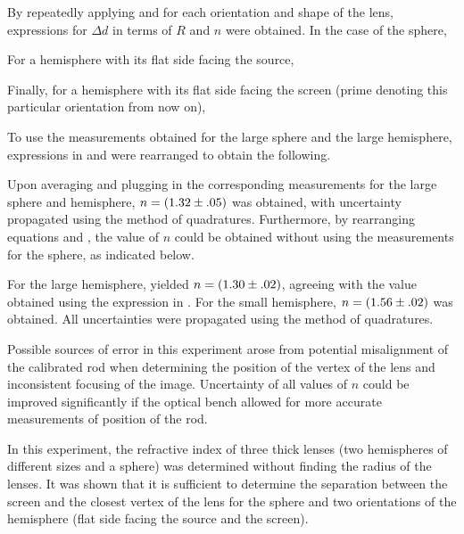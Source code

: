 \begin{paper}
	By repeatedly applying \eqVertexToSecondaryPrincipalPlane and \eqLensMakersFormula for each orientation and shape of the lens, expressions for \( \Delta d \) in terms of \( R \) and \( n \) were obtained. In the case of the sphere,
	
	For a hemisphere with its flat side facing the source, 
	
	Finally, for a hemisphere with its flat side facing the screen (prime denoting this particular orientation from now on),
	
	To use the measurements obtained for the large sphere and the large hemisphere, expressions in \eqSphereData and \eqHemisphereFlatScreen were rearranged to obtain the following.
	
	Upon averaging and plugging in the corresponding measurements for the large sphere and hemisphere, \( n = \left(1.32 \pm .05\right) \) was obtained, with uncertainty propagated using the method of quadratures. Furthermore, by rearranging equations \eqHemisphereFlatSource and \eqHemisphereFlatScreen, the value of \( n \) could be obtained without using the measurements for the sphere, as indicated below.
	
	For the large hemisphere, \eqnHemisphereOnly yielded \( n = \left(1.30 \pm .02\right) \), agreeing with the value obtained using the expression in \eqnValueWithSphere. For the small hemisphere, \( n = \left(1.56 \pm .02\right) \) was obtained. All uncertainties were propagated using the method of quadratures. 
	
	Possible sources of error in this experiment arose from potential misalignment of the calibrated rod when determining the position of the vertex of the lens and inconsistent focusing of the image. Uncertainty of all values of \( n \) could be improved significantly if the optical bench allowed for more accurate measurements of position of the rod.
	

		In this experiment, the refractive index of three thick lenses (two hemispheres of different sizes and a sphere) was determined without finding the radius of the lenses. It was shown that it is sufficient to determine the separation between the screen and the closest vertex of the lens for the sphere and two orientations of the hemisphere (flat side facing the source and the screen). 
		

\end{paper}
